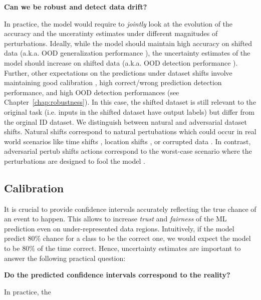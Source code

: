 \begin{center}
    \textbf{Can we be robust and detect data drift?}
\end{center}

In practice, the model would require to \emph{jointly} look at the evolution of the accuracy and the unceratinty estimates under different magnitudes of perturbations. Ideally, while the model should maintain high accuracy on shifted data (a.k.a. OOD generalization performance ), the uncertainty estimates of the model should increase on shifted data (a.k.a. OOD detection performance ). Further, other expectations on the predictions under dataset shifts involve maintaining good calibration \cite{dataset-shift}, high correct/wrong prediction detection performance, and high OOD detection performances (see Chapter~\ref{chap:robustness}). In this case, the shifted dataset is still relevant to the original task (i.e. inputs in the shifted dataset have output labels) but differ from the orginal ID dataset. We distinguish between natural and adversarial dataset shifts. Natural shifts correspond to natural pertubations which could occur in real world scenarios like time shifts , location shifts , or corrupted data . In contrast, adversarial pertub shifts actions correspond to the worst-case scenario where the perturbations are designed to fool the model .

\subsection{Calibration}

It is crucial to provide confidence intervals accurately reflecting the true chance of an event to happen. This allows to increase \emph{trust} and \emph{fairness} of the ML prediction even on under-represented data regions. Intuitively, if the model predict $80\%$ chance for a class to be the correct one, we would expect the model to be $80\%$ of the time correct. Hence, uncertainty estimates are important to answer the following practical question:

\begin{center}
    \textbf{Do the predicted confidence intervals correspond to the reality?}
\end{center}

In practice, the